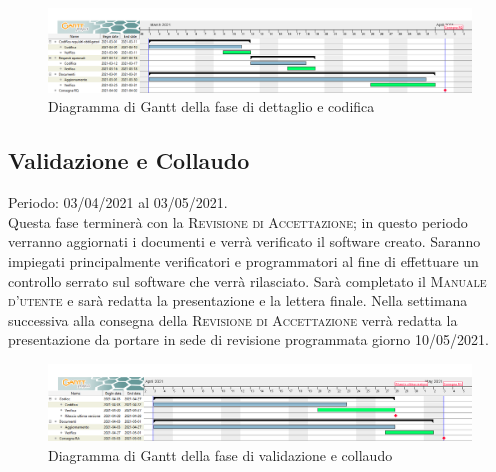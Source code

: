 \documentclass[../piano_di_progetto.tex]{subfiles}
\begin{document}
\begin{figure}[H]
\centering
\includegraphics[width=18cm]{img/gantt/03_RQ.png}
\caption{Diagramma di Gantt della fase di dettaglio e codifica}
\end{figure}

\subsection{Validazione e Collaudo}%
\label{sub:valid_coll}
Periodo: 03/04/2021 al 03/05/2021.\\
Questa fase terminerà con la \textsc{Revisione di Accettazione}; in questo periodo verranno aggiornati i documenti e verrà verificato il software creato. Saranno impiegati principalmente verificatori e programmatori al fine di effettuare un controllo serrato sul software che verrà rilasciato. Sarà completato il \textsc{Manuale d'utente} e sarà redatta la presentazione e la lettera finale. Nella settimana successiva alla consegna della \textsc{Revisione di Accettazione} verrà redatta la presentazione da portare in sede di revisione programmata giorno 10/05/2021.

\begin{figure}[H]
\centering
\includegraphics[width=18cm]{img/gantt/04_RA.png}
\caption{Diagramma di Gantt della fase di validazione e collaudo}
\end{figure}
\end{document}
